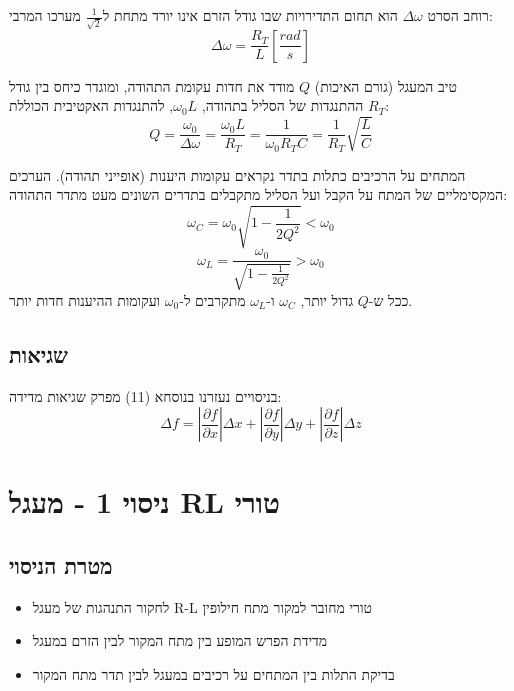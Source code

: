 \documentclass[14pt]{extarticle}
\begin{document}
רוחב הסרט $\Delta\omega$ הוא תחום התדירויות שבו גודל הזרם אינו יורד מתחת ל$\frac{1}{\sqrt{2}}$ מערכו המרבי:
\begin{equation}
    \Delta\omega = \frac{R_T}{L} \left[\frac{rad}{s}\right]
\end{equation}

טיב המעגל (גורם האיכות) $Q$ מודד את חדות עקומת התהודה, ומוגדר כיחס בין גודל ההתנגדות של הסליל בתהודה, $\omega_0 L$, להתנגדות האקטיבית הכוללת $R_T$:
\begin{equation}
    Q = \frac{\omega_0}{\Delta\omega} = \frac{\omega_0 L}{R_T} = \frac{1}{\omega_0 R_T C} = \frac{1}{R_T}\sqrt{\frac{L}{C}}
\end{equation}

המתחים על הרכיבים כתלות בתדר נקראים עקומות היענות (אופייני תהודה). הערכים המקסימליים של המתח על הקבל ועל הסליל מתקבלים בתדרים השונים מעט מתדר התהודה:
\begin{equation}
    \omega_C = \omega_0 \sqrt{1 - \frac{1}{2Q^2}} < \omega_0
\end{equation}
\begin{equation}
    \omega_L = \frac{\omega_0}{\sqrt{1 - \frac{1}{2Q^2}}} > \omega_0
\end{equation}
ככל ש-$Q$ גדול יותר, $\omega_C$ ו-$\omega_L$ מתקרבים ל-$\omega_0$ ועקומות ההיענות חדות יותר.


\subsection*{שגיאות}
בניסויים נעזרנו בנוסחא (11) מפרק שגיאות מדידה:
\begin{equation}
    \Delta f = \left|\frac{\partial f}{\partial x}\right|\Delta x + \left|\frac{\partial f}{\partial y}\right|\Delta y + \left|\frac{\partial f}{\partial z}\right|\Delta z
\end{equation}

\section*{ניסוי 1 - מעגל RL טורי}

\subsection*{מטרת הניסוי}
\begin{itemize}
    \item לחקור התנהגות של מעגל R-L טורי מחובר למקור מתח חילופין
    \item מדידת הפרש המופע בין מתח המקור לבין הזרם במעגל
    \item בדיקת התלות בין המתחים על רכיבים במעגל לבין תדר מתח המקור
\end{itemize}
\end{document}
